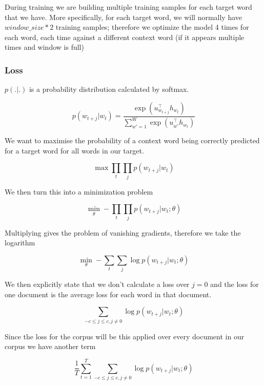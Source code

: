 \documentclass[11pt]{article}
\begin{document}
During training we are building multiple training samples for each target word that we have. More specifically, for each target word, we will normally have $window\_size*2$ training samples; therefore we optimize the model 4 times for each word, each time against a different context word (if it appears multiple times and window is full)

\subsubsection{Loss}

$p(.|.)$ is a probability distribution calculated by softmax.

\begin{equation}
    p(w_{t+j}|w_t) = \frac{\exp({u_{w_{t+j}}^\top h_{w_t}})}{\sum^W_{w'=1} \exp({u_{w'}^\top h_{w_t}})}
    \label{eq:softmax-problem}
\end{equation}

We want to maximise the probability of a context word being correctly predicted for a target word for all words in our target. 

\begin{equation*}
    \max \prod_t \prod_j p(w_{t+j}|w_t)
\end{equation*}

We then turn this into a minimization problem

\begin{equation*}
    \min_\theta - \prod_t \prod_j p(w_{t+j}|w_t;\theta)
\end{equation*}

Multiplying gives the problem of vanishing gradients, therefore we take the logarithm

\begin{equation*}
    \min_\theta - \sum_t \sum_j \log p(w_{t+j}|w_t;\theta)
\end{equation*}

We then explicitly state that we don't calculate a loss over $j=0$ and the loss for one document is the average loss for each word in that document.

\begin{equation*}
    \sum_{-c\leq j \leq c, j \neq 0} \log p(w_{t+j} | w_t ; \theta)
\end{equation*}

Since the loss for the corpus will be this applied over every document in our corpus we have another term

\begin{equation*}
    \frac1 T \sum^T_{t=1} \sum_{-c\leq j \leq c, j \neq 0} \log p(w_{t+j} | w_t ; \theta)
\end{equation*}
\end{document}
